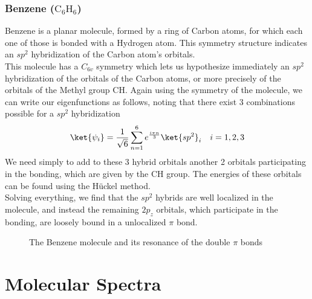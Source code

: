 \documentclass[a4paper, 11pt]{book}
\newcommand{\1}{\opr{\mathds{1}}}
\theoremstyle{plain}
\begin{document}
	\subsection{Benzene ($\mathrm{C_6H_6}$)}
	Benzene is a planar molecule, formed by a ring of Carbon atoms, for which each one of those is bonded with a Hydrogen atom. This symmetry structure indicates an $sp^2$ hybridization of the Carbon atom's orbitals.\\
	This molecule has a $C_{6v}$ symmetry which lets us hypothesize immediately an $sp^2$ hybridization of the orbitals of the Carbon atoms, or more precisely of the orbitals of the Methyl group $\mathrm{CH}$. Again using the symmetry of the molecule, we can write our eigenfunctions as follows, noting that there exist 3 combinations possible for a $sp^2$ hybridization
	\begin{equation}
		\ket{\psi_i}=\frac{1}{\sqrt{6}}\sum_{n=1}^6e^{\frac{i\pi n}{3}}\ket{sp^2}_i\quad i=1,2,3
		\label{eq:benzeneeigenfunctions}
	\end{equation}
	We need simply to add to these 3 hybrid orbitals another 2 orbitals participating in the bonding, which are given by the $\mathrm{CH}$ group. The energies of these orbitals can be found using the Hückel method.\\
	Solving everything, we find that the $sp^2$ hybrids are well localized in the molecule, and instead the remaining $2p_z$ orbitals, which participate in the bonding, are loosely bound in a unlocalized $\pi$ bond.
	\begin{figure}[H]
		\centering
		\qquad\qquad{}
		\label{fig:benzene}
		\caption{The Benzene molecule and its resonance of the double $\pi$ bonds}
	\end{figure}
	\chapter{Molecular Spectra}
\end{document}
